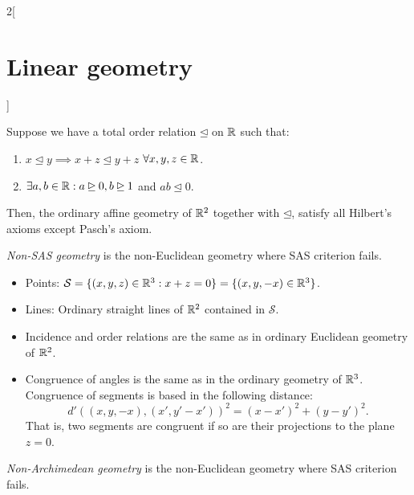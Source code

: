 \documentclass[../../../main.tex]{subfiles}
\begin{document}
\begin{multicols}{2}[\section{Linear geometry}]
\begin{prop}
Suppose we have a total order relation $\unlhd$ on $\mathbb{R} $ such that:
\begin{enumerate}
    \item $x\unlhd y\implies x+z\unlhd y+z$ $\forall x,y,z\in\mathbb{R} $.
    \item $\exists a,b\in\mathbb{R} : a\unrhd 0, b\unrhd 1$ and $ab\unlhd 0$.
\end{enumerate}
Then, the ordinary affine geometry of $\mathbb{R}^2$ together with $\unlhd$, satisfy all Hilbert's axioms except Pasch's axiom.
\end{prop}
\begin{definition}
\textit{Non-SAS geometry} is the non-Euclidean geometry where SAS criterion fails.
\end{definition}
\begin{prop}
\hfill
\begin{itemize}
    \item Points: $\mathcal{S}=\{(x,y,z)\in\mathbb{R}^3:x+z=0\}=\{(x,y,-x)\in\mathbb{R}^3\}$.
    \item Lines: Ordinary straight lines of $\mathbb{R}^2$ contained in $\mathcal{S}$.
    \item Incidence and order relations are the same as in ordinary Euclidean geometry of $\mathbb{R}^2$.
    \item Congruence of angles is the same as in the ordinary geometry of $\mathbb{R}^3$. Congruence of segments is based in the following distance:  $$d'((x,y,-x),(x',y'-x'))^2=(x-x')^2+(y-y')^2.$$ That is, two segments are congruent if so are their projections to the plane $z=0$.
\end{itemize}
\end{prop}
\begin{definition}
\textit{Non-Archimedean geometry} is the non-Euclidean geometry where SAS criterion fails.
\end{definition}

\end{multicols}
\end{document}
